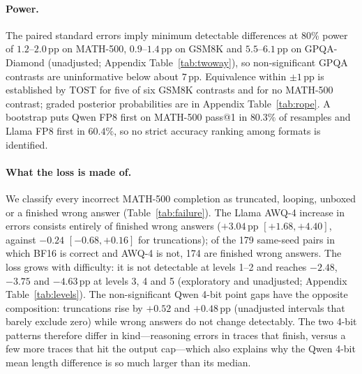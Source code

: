 \documentclass[11pt,a4paper]{article}
\begin{document}
\paragraph{Power.} The paired standard errors imply minimum detectable differences at 80\% power of $1.2$--$2.0$\,pp on MATH-500, $0.9$--$1.4$\,pp on GSM8K and $5.5$--$6.1$\,pp on GPQA-Diamond (unadjusted; Appendix Table~\ref{tab:twoway}), so non-significant GPQA contrasts are uninformative below about $7$\,pp. Equivalence within $\pm1$\,pp is established by TOST for five of six GSM8K contrasts and for no MATH-500 contrast; graded posterior probabilities are in Appendix Table~\ref{tab:rope}. A bootstrap puts Qwen FP8 first on MATH-500 pass@1 in $80.3\%$ of resamples and Llama FP8 first in $60.4\%$, so no strict accuracy ranking among formats is identified.

\paragraph{What the loss is made of.}
\label{sec:failure}
We classify every incorrect MATH-500 completion as truncated, looping, unboxed or a finished wrong answer (Table~\ref{tab:failure}). The Llama AWQ-4 increase in errors consists entirely of finished wrong answers ($+3.04$\,pp $[+1.68,+4.40]$, against $-0.24$ $[-0.68,+0.16]$ for truncations); of the 179 same-seed pairs in which BF16 is correct and AWQ-4 is not, 174 are finished wrong answers. The loss grows with difficulty: it is not detectable at levels 1--2 and reaches $-2.48$, $-3.75$ and $-4.63$\,pp at levels 3, 4 and 5 (exploratory and unadjusted; Appendix Table~\ref{tab:levels}). The non-significant Qwen 4-bit point gaps have the opposite composition: truncations rise by $+0.52$ and $+0.48$\,pp (unadjusted intervals that barely exclude zero) while wrong answers do not change detectably. The two 4-bit patterns therefore differ in kind---reasoning errors in traces that finish, versus a few more traces that hit the output cap---which also explains why the Qwen 4-bit mean length difference is so much larger than its median.
\end{document}
